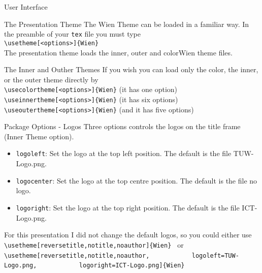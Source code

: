   
\begin{frame}{User Interface}
  \begin{block}{The Presentation Theme}
     The Wien Theme can be loaded in a familiar way. In the preamble
     of your {\tt tex} file you must type\\
     \vspace{5pt}  
    {\tt \textbackslash usetheme[<options>]\{Wien\}}\\ \vspace{5pt} 
    The presentation theme loads the inner, outer and colorWien theme files.
  \end{block}
  \begin{block}{The Inner and Outher Themes}
    If you wish you can load only the color, the inner, or the outer theme directly by\\ \vspace{5pt} 
    {\tt \textbackslash usecolortheme[<options>]\{Wien\}} (it has one option)\\ \vspace{5pt} 
    {\tt \textbackslash useinnertheme[<options>]\{Wien\}} (it has six options)\\ \vspace{5pt} 
    {\tt \textbackslash useoutertheme[<options>]\{Wien\}} (and it has five options)\\
  \end{block}
  
\end{frame}

\begin{frame}[fragile]{Package Options - Logos}
   Three options controls the logos on the title frame (Inner Theme option).
  
\begin{itemize}
\item \texttt{logoleft}: Set the logo at the top left position. The default is the file TUW-Logo.png.
\item \texttt{logocenter}: Set the logo at the top centre position. The default is the file no logo.
\item \texttt{logoright}: Set the logo at the top right position. The default is the file ICT-Logo.png.
\end{itemize}

For this presentation I did not change the default logos, so you could either use
\verb| \usetheme[reversetitle,notitle,noauthor]{Wien} |
or
\verb| \usetheme[reversetitle,notitle,noauthor,|
\verb|           logoleft=TUW-Logo.png,|
\verb|           logoright=ICT-Logo.png]{Wien} |


\end{frame}

